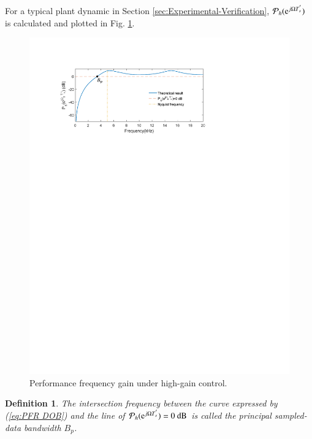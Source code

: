 \documentclass [11pt, proquest] {uwthesis}[2020/02/24]
\newtheorem{definition}{Definition}
\begin{document}
For a typical plant dynamic in Section \ref{sec:Experimental-Verification},
$\mathcal{P}_{h}(\mathrm{e}^{j\Omega T_{s}^{'}})$ is calculated and plotted
in Fig. \ref{fig:Performace-frequency-gain}. 
\begin{figure}[!ht]
\begin{centering}
\includegraphics[width=13cm]{Spectral-analysis/FIG9.pdf}
\par\end{centering}
\caption{\label{fig:Performace-frequency-gain}Performance frequency gain under
high-gain control.}
\end{figure}

\begin{definition}\label{enu:The-first-intersection}The intersection
frequency between the curve expressed by (\ref{eq:PFR DOB}) and the
line of $\mathcal{P}_{h}(\mathrm{e}^{j\Omega T_{s}^{'}})=\text{0 dB}$ is
called the \emph{principal sampled-data bandwidth} $B_{p}$. \end{definition} 
\end{document}
